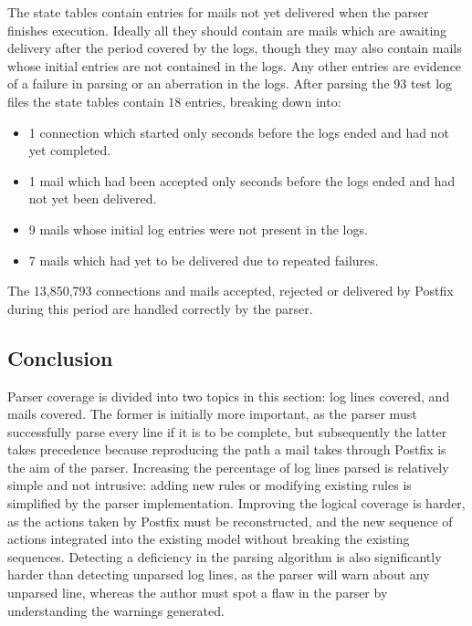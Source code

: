 \documentclass[a4paper,12pt,draft]{article}
\begin{document}
The state tables contain entries for mails not yet delivered when the
parser finishes execution.  Ideally all they should contain are mails which
are awaiting delivery after the period covered by the logs, though they may
also contain mails whose initial entries are not contained in the logs.
Any other entries are evidence of a failure in parsing or an aberration in
the logs.  After parsing the 93 test log files the state tables contain 18
entries, breaking down into:

\begin{itemize}

    \item 1 connection which started only seconds before the logs ended and
        had not yet completed.

    \item 1 mail which had been accepted only seconds before the logs ended
        and had not yet been delivered.

    \item 9 mails whose initial log entries were not present in the logs.

    \item 7 mails which had yet to be delivered due to repeated failures.

\end{itemize}

The 13,850,793 connections and mails accepted, rejected or delivered by
Postfix during this period are handled correctly by the parser.

\subsection{Conclusion}

Parser coverage is divided into two topics in this section: log lines
covered, and mails covered.  The former is initially more important, as the
parser must successfully parse every line if it is to be complete, but
subsequently the latter takes precedence because reproducing the path a
mail takes through Postfix is the aim of the parser.  Increasing the
percentage of log lines parsed is relatively simple and not intrusive:
adding new rules or modifying existing rules is simplified by the parser
implementation.  Improving the logical coverage is harder, as the actions
taken by Postfix must be reconstructed, and the new sequence of actions
integrated into the existing model without breaking the existing sequences.
Detecting a deficiency in the parsing algorithm is also significantly
harder than detecting unparsed log lines, as the parser will warn about any
unparsed line, whereas the author must spot a flaw in the parser by
understanding the warnings generated.
\end{document}
